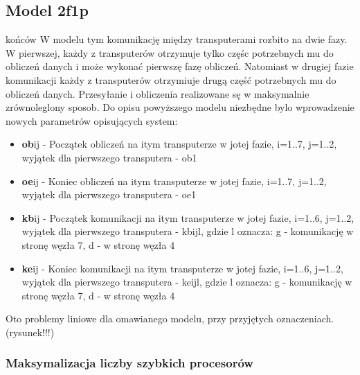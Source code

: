 \documentclass[a4paper,11pt, titlepage]{article}
\begin{document}
\subsection{Model 2f1p}końców
W modelu tym komunikację między transputerami rozbito na dwie fazy. W pierwszej, każdy z transputerów otrzymuje tylko częśc potrzebnych mu do obliczeń danych i może wykonać pierwszę fazę obliczeń. Natomiast w drugiej fazie komunikacji każdy z transputerów otrzymiuje drugą część potrzebnych mu do obliczeń danych. Przesyłanie i obliczenia realizowane sę w maksymalnie zrównoleglony sposob. 
Do opisu powyższego modelu niezbędne bylo wprowadzenie nowych parametrów opisujących system:
\begin{itemize}
\item \textbf{ob}ij - Początek obliczeń na itym transputerze w jotej fazie, i=1..7, j=1..2, wyjątek dla pierwszego transputera - ob1
\item \textbf{oe}ij - Koniec obliczeń na itym transputerze w jotej fazie, i=1..7, j=1..2, wyjątek dla pierwszego transputera - oe1
\item \textbf{kb}ij - Początek komunikacji na itym transputerze w jotej fazie, i=1..6, j=1..2, wyjątek dla pierwszego transputera - kbijl, gdzie l oznacza: g - komunikację w stronę węzła 7, d - w stronę węzła 4
\item \textbf{ke}ij - Koniec komunikacji na itym transputerze w jotej fazie, i=1..6, j=1..2, wyjątek dla pierwszego transputera - keijl, gdzie l oznacza: g - komunikację w stronę węzła 7, d - w stronę węzła 4 
\end{itemize}
Oto problemy liniowe dla omawianego modelu, przy przyjętych oznaczeniach.(rysunek!!!)
\subsubsection{Maksymalizacja liczby szybkich procesorów}
\end{document}
